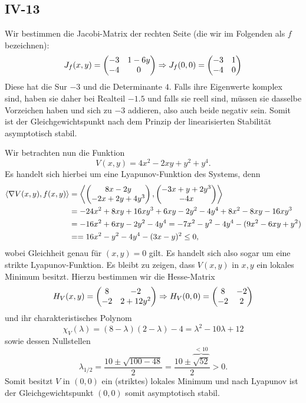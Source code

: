 \documentclass[a4paper]{article}
\begin{document}
\subsection{IV-13}

Wir bestimmen die Jacobi-Matrix der rechten Seite (die wir im Folgenden als $f$ bezeichnen):
\begin{equation*}
    J_f(x,y) = \left(\begin{matrix}-3 & 1 - 6y \\ -4 & 0\end{matrix}\right) \Rightarrow J_f(0,0) = \left(\begin{matrix}-3 & 1 \\ -4 & 0\end{matrix}\right)
\end{equation*}
Diese hat die Sur $-3$ und die Determinante $4$.
Falls ihre Eigenwerte komplex sind, haben sie daher bei Realteil $- 1.5$ und falls sie reell sind, müssen sie dasselbe Vorzeichen haben und sich zu $- 3$ addieren, also auch beide negativ sein.
Somit ist der Gleichgewichtspunkt nach dem Prinzip der linearisierten Stabilität asymptotisch stabil.

Wir betrachten nun die Funktion
\begin{equation*}
    V(x,y) = 4x^2 - 2xy + y^2 + y^4\text{.}
\end{equation*}
Es handelt sich hierbei um eine Lyapunov-Funktion des Systems, denn
\begin{align*}
    \langle \nabla V(x,y), f(x,y) \rangle &= \left\langle \left(\begin{matrix}8x - 2y \\ -2x + 2y + 4y^3\end{matrix}\right), \left(\begin{matrix}-3x +y + 2y^3 \\ -4x\end{matrix}\right)  \right\rangle\\
    &= -24x^2 + 8xy + 16xy^3 + 6xy - 2y^2 - 4y^4 + 8x^2 - 8xy - 16xy^3\\
    &= -16x^2 + 6xy - 2y^2 - 4y^4 = -7x^2 - y^2 - 4y^4 -(9x^2 - 6xy + y^2)\\
    &= =16x^2 - y^2 - 4y^4 - (3x - y)^2 \leq 0\text{,}
\end{align*}
wobei Gleichheit genau für $(x,y) = 0$ gilt. Es handelt sich also sogar um eine strikte Lyapunov-Funktion.
Es bleibt zu zeigen, dass $V(x,y)$ in $x,y$ ein lokales Minimum besitzt.
Hierzu bestimmen wir die Hesse-Matrix
\begin{align*}
    H_V(x,y) = \left(\begin{matrix}8 & -2 \\ -2 & 2 + 12y^2\end{matrix}\right) \Rightarrow H_V(0,0) = \left(\begin{matrix}8 & -2 \\ -2 & 2\end{matrix}\right)
\end{align*}
und ihr charakteristisches Polynom
\begin{equation*}
    \chi_V(\lambda) = (8 - \lambda)(2 - \lambda) - 4 = \lambda^2 - 10 \lambda + 12
\end{equation*}
sowie dessen Nullstellen
\begin{equation*}
    \lambda_{1/2} = \frac{10 \pm \sqrt{100 - 48}}{2} = \frac{10 \pm \overbrace{\sqrt{52}}^{< 10}}{2} > 0\text{.}
\end{equation*}
Somit besitzt $V$ in $(0,0)$ ein (striktes) lokales Minimum und nach Lyapunov ist der Gleichgewichtspunkt $(0,0)$ somit asymptotisch stabil.
\end{document}
